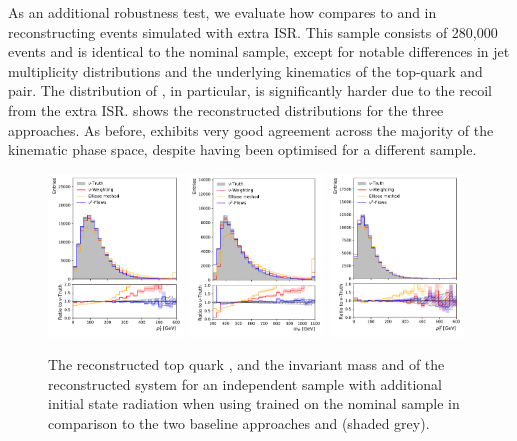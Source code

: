As an additional robustness test, we evaluate how \vvflows compares to \vweight and \ellipse in reconstructing \ttbar events simulated with extra ISR.
This sample consists of 280,000 events and is identical to the nominal sample, except for notable differences in jet multiplicity distributions and the underlying kinematics of the top-quark and \ttbar pair.
The distribution of \pttt, in particular, is significantly harder due to the recoil from the extra ISR.
 shows the reconstructed distributions for the three approaches.
As before, \vvflows exhibits very good agreement across the majority of the kinematic phase space, despite having been optimised for a different sample.

\begin{figure}[htbp]
    \centering
    \includegraphics[width=0.32\textwidth]{Figures/neutrino_unfolding/extraISR/topanti_top_pt.pdf}
    \includegraphics[width=0.32\textwidth]{Figures/neutrino_unfolding/extraISR/ttbar_m.pdf}
    \includegraphics[width=0.32\textwidth]{Figures/neutrino_unfolding/extraISR/ttbar_pt.pdf}
    \caption{The reconstructed top quark \pt, and the invariant mass and \pt of the reconstructed \ttbar system for an independent sample with additional initial state radiation when using \vvflows trained on the nominal sample in comparison to the two baseline approaches and \vtruth (shaded grey).
    }
    \label{fig:extraISRttbar}
\end{figure}

